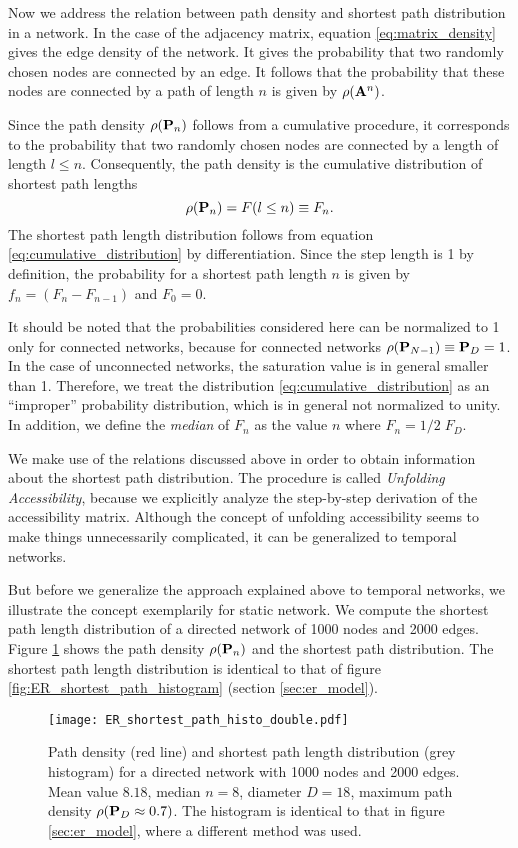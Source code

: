 Now we address the relation between path density and shortest path distribution in a network.
In the case of the adjacency matrix, equation \eqref{eq:matrix_density} gives the edge density of the network.
It gives the probability that two randomly chosen nodes are connected by an edge.
It follows that the probability that these nodes are connected by a path of length $n$ is given by $\rho (\mathbf{A}^n)$.

Since the path density $\rho (\mathbf{P}_n)$ follows from a cumulative procedure, it corresponds to the probability that two randomly chosen nodes are connected by a length of length $l\leq n$.
Consequently, the path density is the cumulative distribution of shortest path lengths
\begin{equation}\label{eq:cumulative_distribution}
\rho (\mathbf{P}_n)=F(l\leq n)\equiv F_n .
\end{equation}
The shortest path length distribution follows from equation \eqref{eq:cumulative_distribution} by differentiation.
Since the step length is 1 by definition, the probability for a shortest path length $n$ is given by $f_n=(F_n-F_{n-1})$ and $F_0=0$.

It should be noted that the probabilities considered here can be normalized to 1 only for connected networks, because for connected networks $\rho (\mathbf{P}_{N-1})\equiv \mathbf{P}_D=1$.
In the case of unconnected networks, the saturation value is in general smaller than 1.
Therefore,  we treat the distribution \eqref{eq:cumulative_distribution} as an ``improper'' probability distribution, which is in general not normalized to unity.
In addition, we define the \emph{median} of $F_n$ as the value $n$ where $F_n=1/2 \; F_D$.

We make use of the relations discussed above in order to obtain information about the shortest path distribution.
The procedure is called \emph{Unfolding Accessibility}, because we explicitly analyze the step-by-step derivation of the accessibility matrix.
Although the concept of unfolding accessibility seems to make things unnecessarily complicated, it can be generalized to temporal networks.

But before we generalize the approach explained above to temporal networks, we illustrate the concept exemplarily for static \ER network.
We compute the shortest path length distribution of a directed \ER network of 1000 nodes and 2000 edges.
Figure \ref{fig:er_histo} shows the path density $\rho (\mathbf{P}_n)$ and the shortest path distribution.
The shortest path length distribution is identical to that of figure \ref{fig:ER_shortest_path_histogram} (section \ref{sec:er_model}).
%
\begin{figure}[htbp]
\begin{center}
\texttt{[image: ER\_shortest\_path\_histo\_double.pdf]}
\caption{Path density (red line) and shortest path length distribution (grey histogram) for a directed \ER network with 1000 nodes and 2000 edges.
Mean value $8.18$, median $n=8$, diameter $D=18$, maximum path density $\rho (\mathbf{P}_D\approx 0.7)$.
The histogram is identical to that in figure \ref{sec:er_model}, where a different method was used.
}
\label{fig:er_histo}
\end{center}
\end{figure}
%

